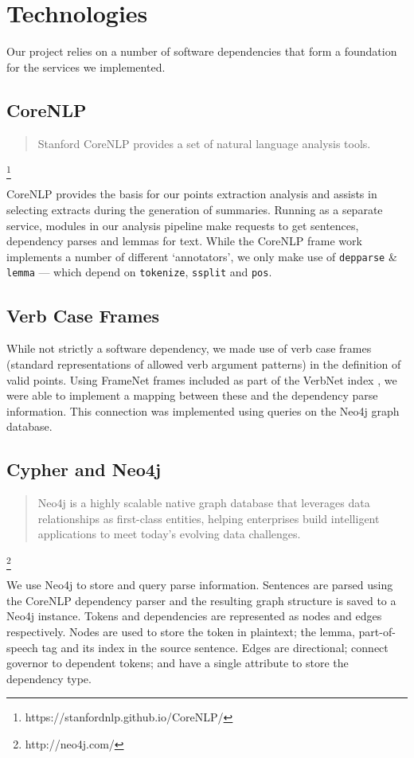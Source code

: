 \chapter{Technologies\label{chap:technologies}}
  Our project relies on a number of software dependencies that form a foundation for the services we implemented.

  \tocless\section{CoreNLP}
    \blockquote{Stanford CoreNLP provides a set of natural language analysis tools.}\footnote{https://stanfordnlp.github.io/CoreNLP/}

    CoreNLP provides the basis for our points extraction analysis and assists in selecting extracts during the generation of summaries. Running as a separate service, modules in our analysis pipeline make requests to get sentences, dependency parses and lemmas for text. While the CoreNLP frame work implements a number of different `annotators', we only make use of \texttt{depparse} \& \texttt{lemma} --- which depend on \texttt{tokenize}, \texttt{ssplit} and \texttt{pos}.

  \tocless\section{Verb Case Frames}
    While not strictly a software dependency, we made use of verb case frames (standard representations of allowed verb argument patterns) in the definition of valid points. Using FrameNet frames included as part of the VerbNet index \cite{schuler2005verbnet, fillmore2002framenet}, we were able to implement a mapping between these and the dependency parse information. This connection was implemented using queries on the Neo4j graph database.

  \tocless\section{Cypher and Neo4j}
    \blockquote{Neo4j is a highly scalable native graph database that leverages data relationships as first-class entities, helping enterprises build intelligent applications to meet today's evolving data challenges.}\footnote{http://neo4j.com/}

    We use Neo4j to store and query parse information. Sentences are parsed using the CoreNLP dependency parser and the resulting graph structure is saved to a Neo4j instance. Tokens and dependencies are represented as nodes and edges respectively. Nodes are used to store the token in plaintext; the lemma, part-of-speech tag and its index in the source sentence. Edges are directional; connect governor to dependent tokens; and have a single attribute to store the dependency type.

